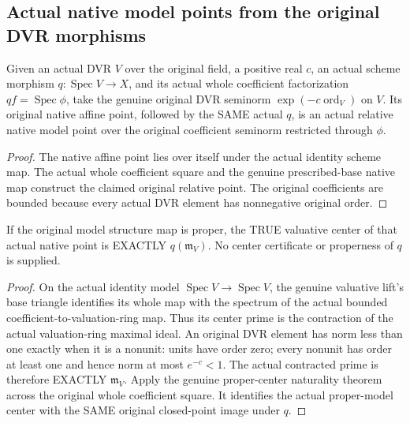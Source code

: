 \subsection{Actual native model points from the original DVR morphisms}

\begin{definition}
\label{berkovich:actual-dvr-native-model-point}
\leanok
Given an actual DVR $V$ over the original field, a positive real $c$, an actual
scheme morphism $q:\operatorname{Spec}V\to X$, and its actual whole coefficient
factorization $qf=\operatorname{Spec}\phi$, take the genuine original DVR
seminorm $\exp(-c\operatorname{ord}_V)$ on $V$. Its original native affine point,
followed by the SAME actual $q$, is an actual relative native model point over
the original coefficient seminorm restricted through $\phi$.
\end{definition}
\begin{proof}
The native affine point lies over itself under the actual identity scheme map.
The actual whole coefficient square and the genuine prescribed-base native
map construct the claimed original relative point. The original coefficients
are bounded because every actual DVR element has nonnegative original order.
\end{proof}

\begin{theorem}
\label{berkovich:actual-dvr-native-model-center}
\leanok
{}
If the original model structure map is proper, the TRUE valuative center of
that actual native point is EXACTLY $q(\mathfrak m_V)$. No center certificate
or properness of $q$ is supplied.
\end{theorem}
\begin{proof}
On the actual identity model $\operatorname{Spec}V\to\operatorname{Spec}V$,
the genuine valuative lift's base triangle identifies its whole map with the
spectrum of the actual bounded coefficient-to-valuation-ring map. Thus its
center prime is the contraction of the actual valuation-ring maximal ideal.
An original DVR element has norm less than one exactly when it is a nonunit:
units have order zero; every nonunit has order at least one and hence norm
at most $e^{-c}<1$. The actual contracted prime is therefore EXACTLY
$\mathfrak m_V$. Apply the genuine proper-center naturality theorem across
the original whole coefficient square. It identifies the actual proper-model
center with the SAME original closed-point image under $q$.
\end{proof}

